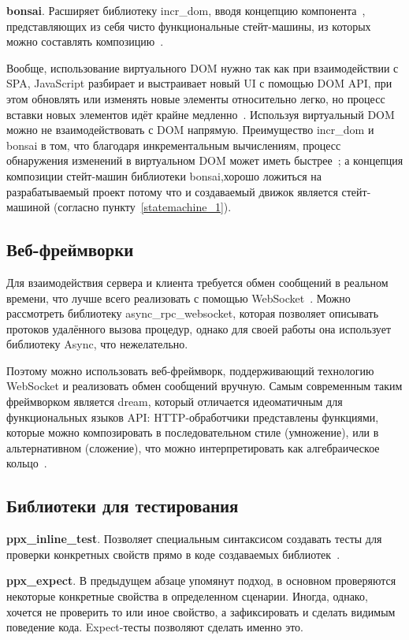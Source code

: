 \textbf{bonsai}. Расширяет библиотеку incr\_dom, вводя концепцию компонента~\cite{bonsai-history},
представляющих из себя чисто функциональные стейт-машины, из которых можно составлять композицию~\cite{janestreet-bonsai}.

Вообще, использование виртуального DOM нужно так как при взаимодействии с SPA, JavaScript разбирает и выстраивает новый UI
с помощью DOM API, при этом обновлять или изменять новые элементы относительно легко, но процесс вставки новых элементов
идёт крайне медленно~\cite[с. 72]{react-book}. Используя виртуальный DOM можно не взаимодействовать с DOM напрямую.
Преимущество incr\_dom и bonsai в том, что благодаря инкрементальным вычислениям, процесс обнаружения изменений в
виртуальном DOM может иметь быстрее~\cite{minsky-incrdom};
а концепция композиции стейт-машин библиотеки bonsai,хорошо ложиться на
разрабатываемый проект потому что и создаваемый движок является стейт-машиной (согласно пункту~\ref{statemachine_1}).

\subsection{Веб-фреймворки}

Для взаимодействия сервера и клиента требуется обмен сообщений в реальном времени, что лучше всего реализовать
с помощью WebSocket~\cite{mdn-websocket}. Можно рассмотреть библиотеку async\_rpc\_websocket,
которая позволяет описывать протоков удалённого вызова процедур, однако
для своей работы она использует библиотеку Async, что нежелательно.

Поэтому можно использовать веб-фреймворк, поддерживающий технологию WebSocket и реализовать обмен сообщений вручную.
Самым современным таким фреймворком является dream, который отличается идеоматичным для функциональных языков API:
HTTP-обработчики представлены функциями, которые можно композировать в последовательном стиле (умножение),
или в альтернативном (сложение), что можно интерпретировать как алгебраическое кольцо~\cite{dream}.

\subsection{Библиотеки для тестирования}

\textbf{ppx\_inline\_test}. Позволяет специальным синтаксисом создавать тесты
для проверки конкретных свойств
прямо в коде создаваемых библиотек~\cite{rwo-testing}.

\textbf{ppx\_expect}. В предыдущем абзаце упомянут подход, в основном проверяются некоторые конкретные
свойства в определенном сценарии. Иногда, однако, хочется не проверить то или иное свойство, а зафиксировать
и сделать видимым поведение кода. Expect-тесты позволяют сделать именно это.~\cite{rwo-testing}

